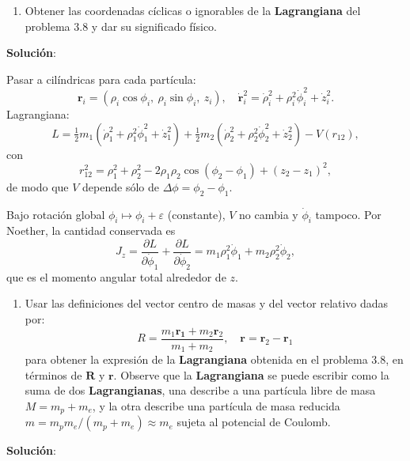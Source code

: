 \documentclass{article}
\newenvironment{AGbox}[1][7]%
{%
  \begin{tcolorbox}[
    enhanced, breakable,
    colframe=AppleGreen,
    colback=AppleGreen!#1,
    boxrule=1pt,
    borderline west={2mm}{-10mm}{AppleGreen},
    sharp corners=southwest,
    left=14pt,right=14pt,top=10pt,bottom=10pt,
     boxsep=6pt,
  ]%
}{%
  \end{tcolorbox}%
}
\begin{document}
\begin{AGbox}[8]
\begin{enumerate}[label={{\textcolor{trueblue}{\textbf{Pr.} \arabic*.9}}}, start=3]
  \item Obtener las coordenadas cíclicas o ignorables de la \textbf{Lagrangiana} del problema 3.8 y dar su significado físico.
\end{enumerate}
\end{AGbox}

\textcolor{Cinnabar}{\textbf{Solución}}:

Pasar a cilíndricas para cada partícula:
\[
\boldsymbol r_i = (\rho_i\cos\phi_i,\ \rho_i\sin\phi_i,\ z_i),\quad
\dot{\boldsymbol r}_i^2=\dot\rho_i^2+\rho_i^2\dot\phi_i^2+\dot z_i^2.
\]
Lagrangiana:
\[
L=\tfrac12 m_1(\dot\rho_1^2+\rho_1^2\dot\phi_1^2+\dot z_1^2)
+\tfrac12 m_2(\dot\rho_2^2+\rho_2^2\dot\phi_2^2+\dot z_2^2)
- V(r_{12}),
\]
con
\[
r_{12}^2 = \rho_1^2+\rho_2^2-2\rho_1\rho_2\cos(\phi_2-\phi_1)+(z_2-z_1)^2,
\]
de modo que \(V\) depende sólo de \(\Delta\phi=\phi_2-\phi_1\).

Bajo rotación global \(\phi_i\mapsto\phi_i+\varepsilon\) (constante), \(V\) no cambia y \(\dot\phi_i\) tampoco. Por Noether, la cantidad conservada es
\[
J_z = \frac{\partial L}{\partial\dot\phi_1} + \frac{\partial L}{\partial\dot\phi_2}
= m_1\rho_1^2\dot\phi_1 + m_2\rho_2^2\dot\phi_2,
\]
que es el momento angular total alrededor de \(z\).



\begin{AGbox}[8]
\begin{enumerate}[label={{\textcolor{trueblue}{\textbf{Pr.} \arabic*.10}}}, start=3]
  \item Usar las definiciones del vector centro de masas y del vector relativo dadas por:
  \[R = \frac{ m_{1} \boldsymbol{r_{1}} + m_{2}\boldsymbol{r}_{2}  }{m_{1} + m_{2}}, \quad \boldsymbol{r}  = \boldsymbol{r}_{2} - \boldsymbol{r}_{1}     \] 
  para obtener la expresión de la \textbf{Lagrangiana} obtenida en el problema 3.8, en términos de $\boldsymbol{R}$ y $\boldsymbol{r}$. Observe que la \textbf{Lagrangiana} se puede escribir como la suma de dos \textbf{Lagrangianas}, una describe a una partícula libre de masa $M = m_{p} + m_{e}$, y la otra describe una partícula de masa reducida $m=m_{p}m_{e}/(m_{p}+m_{e})\approx m_{e}$ sujeta al potencial de Coulomb. 
\end{enumerate}
\end{AGbox}

\textcolor{Cinnabar}{\textbf{Solución}}:
\end{document}
